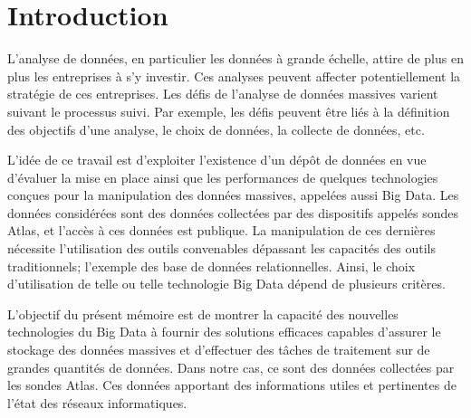 \chapter*{Introduction}


L'analyse de données, en particulier les données à grande échelle, attire de plus en plus les entreprises à s'y investir.  Ces analyses peuvent affecter potentiellement la stratégie de ces entreprises. 
Les défis de l'analyse de données massives varient suivant le processus suivi. Par exemple, les défis peuvent être liés à la définition  des objectifs d'une analyse, le choix de données, la collecte de données, etc.


L'idée de ce travail est  d'exploiter l'existence d'un dépôt de données en vue d'évaluer la mise en place ainsi que les performances de quelques technologies conçues pour la manipulation des données massives, appelées aussi Big Data.
Les données considérées sont des données  collectées par des dispositifs appelés sondes Atlas,  et  l'accès à ces données est publique. 
 La manipulation de ces dernières nécessite l'utilisation des outils convenables dépassant les capacités des outils traditionnels; l'exemple des base de données relationnelles.  Ainsi, le choix d'utilisation de telle ou telle technologie Big Data dépend de plusieurs critères. 


L'objectif du présent mémoire est de montrer la capacité des nouvelles technologies du Big Data à fournir des solutions efficaces capables d'assurer le stockage des données massives et d'effectuer des tâches de traitement sur de grandes quantités de données. Dans notre cas, ce sont des données collectées par les sondes Atlas. Ces  données apportant des informations utiles et pertinentes de l'état des réseaux informatiques.


